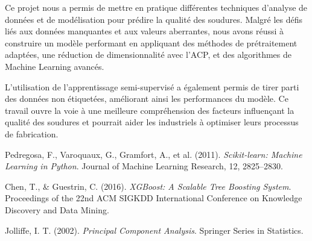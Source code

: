 \documentclass{article}
\begin{document}
Ce projet nous a permis de mettre en pratique différentes techniques d'analyse de données et de modélisation pour prédire la qualité des soudures. Malgré les défis liés aux données manquantes et aux valeurs aberrantes, nous avons réussi à construire un modèle performant en appliquant des méthodes de prétraitement adaptées, une réduction de dimensionnalité avec l'ACP, et des algorithmes de Machine Learning avancés.

L'utilisation de l'apprentissage semi-supervisé a également permis de tirer parti des données non étiquetées, améliorant ainsi les performances du modèle. Ce travail ouvre la voie à une meilleure compréhension des facteurs influençant la qualité des soudures et pourrait aider les industriels à optimiser leurs processus de fabrication.

\begin{thebibliography}{9}

Pedregosa, F., Varoquaux, G., Gramfort, A., et al. (2011). \textit{Scikit-learn: Machine Learning in Python}. Journal of Machine Learning Research, 12, 2825–2830.

Chen, T., \& Guestrin, C. (2016). \textit{XGBoost: A Scalable Tree Boosting System}. Proceedings of the 22nd ACM SIGKDD International Conference on Knowledge Discovery and Data Mining.

Jolliffe, I. T. (2002). \textit{Principal Component Analysis}. Springer Series in Statistics.

\end{thebibliography}
\end{document}

